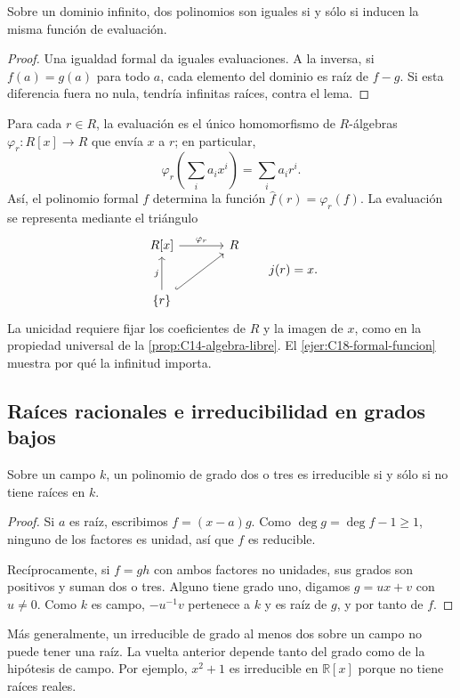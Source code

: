 \begin{coro}\label{coro:C19-funciones}
Sobre un dominio infinito, dos polinomios son iguales si y sólo si inducen la misma función de evaluación.
\end{coro}
\begin{proof}
Una igualdad formal da iguales evaluaciones. A la inversa, si $f(a)=g(a)$ para todo $a$, cada elemento del dominio es raíz de $f-g$. Si esta diferencia fuera no nula, tendría infinitas raíces, contra el lema.
\end{proof}
Para cada $r\in R$, la evaluación es el único homomorfismo de $R$-álgebras $\varphi_r:R[x]\to R$ que envía $x$ a $r$; en particular,
\[
\varphi_r\left(\sum_i a_ix^i\right)=\sum_i a_ir^i.
\]
Así, el polinomio formal $f$ determina la función $\widehat f(r)=\varphi_r(f)$. La evaluación se representa mediante el triángulo
\[
\begin{tikzcd}[column sep=large,row sep=large]
R[x]\arrow[r,"\varphi_r"]&R\\
\{r\}\arrow[u,"j"]\arrow[ur,hook]&
\end{tikzcd}
\qquad j(r)=x.
\]
La unicidad requiere fijar los coeficientes de $R$ y la imagen de $x$, como en la propiedad universal de la \cref{prop:C14-algebra-libre}. El \cref{ejer:C18-formal-funcion} muestra por qué la infinitud importa.

\subsection{Raíces racionales e irreducibilidad en grados bajos}\label{tema:19-1-2a}\label{tema:19-1-2c}\label{tema:19-1-3}
\begin{prop}\label{prop:C19-grados-bajos}
Sobre un campo $k$, un polinomio de grado dos o tres es irreducible si y sólo si no tiene raíces en $k$.
\end{prop}
\begin{proof}
Si $a$ es raíz, escribimos $f=(x-a)g$. Como $\deg g=\deg f-1\geq1$, ninguno de los factores es unidad, así que $f$ es reducible.

Recíprocamente, si $f=gh$ con ambos factores no unidades, sus grados son positivos y suman dos o tres. Alguno tiene grado uno, digamos $g=ux+v$ con $u\ne0$. Como $k$ es campo, $-u^{-1}v$ pertenece a $k$ y es raíz de $g$, y por tanto de $f$.
\end{proof}
Más generalmente, un irreducible de grado al menos dos sobre un campo no puede tener una raíz. La vuelta anterior depende tanto del grado como de la hipótesis de campo. Por ejemplo, $x^2+1$ es irreducible en $\mathbb R[x]$ porque no tiene raíces reales.

